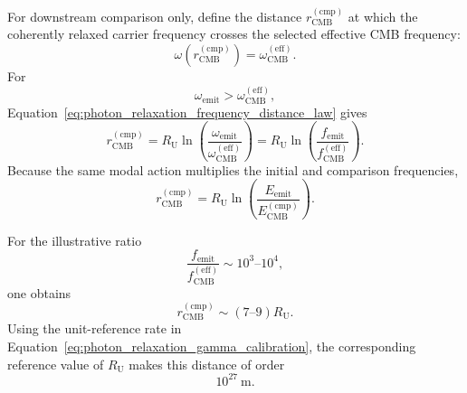 For downstream comparison only, define the distance
\(r_{\mathrm{CMB}}^{(\mathrm{cmp})}\)
at which the coherently relaxed carrier frequency crosses the selected
effective CMB frequency:
\begin{equation}
    \omega
    \left(
        r_{\mathrm{CMB}}^{(\mathrm{cmp})}
    \right)
    =
    \omega_{\mathrm{CMB}}^{(\mathrm{eff})}.
    \label{eq:photon_relaxation_assimilation_condition}
\end{equation}
For
\begin{equation}
    \omega_{\mathrm{emit}}
    >
    \omega_{\mathrm{CMB}}^{(\mathrm{eff})},
    \label{eq:photon_relaxation_assimilation_domain}
\end{equation}
Equation~\eqref{eq:photon_relaxation_frequency_distance_law} gives
\begin{equation}
    r_{\mathrm{CMB}}^{(\mathrm{cmp})}
    =
    R_{\mathrm U}
    \ln
    \left(
        \frac{
            \omega_{\mathrm{emit}}
        }{
            \omega_{\mathrm{CMB}}^{(\mathrm{eff})}
        }
    \right)
    =
    R_{\mathrm U}
    \ln
    \left(
        \frac{
            f_{\mathrm{emit}}
        }{
            f_{\mathrm{CMB}}^{(\mathrm{eff})}
        }
    \right).
    \label{eq:photon_relaxation_assimilation_distance_frequency}
\end{equation}
Because the same modal action multiplies the initial and comparison
frequencies,
\begin{equation}
    r_{\mathrm{CMB}}^{(\mathrm{cmp})}
    =
    R_{\mathrm U}
    \ln
    \left(
        \frac{
            E_{\mathrm{emit}}
        }{
            E_{\mathrm{CMB}}^{(\mathrm{cmp})}
        }
    \right).
    \label{eq:photon_relaxation_assimilation_distance_energy}
\end{equation}

For the illustrative ratio
\begin{equation}
    \frac{
        f_{\mathrm{emit}}
    }{
        f_{\mathrm{CMB}}^{(\mathrm{eff})}
    }
    \sim
    10^3
    \text{--}
    10^4,
    \label{eq:photon_relaxation_optical_cmb_ratio}
\end{equation}
one obtains
\begin{equation}
    r_{\mathrm{CMB}}^{(\mathrm{cmp})}
    \sim
    \left(
        7
        \text{--}
        9
    \right)
    R_{\mathrm U}.
    \label{eq:photon_relaxation_optical_assimilation_scale}
\end{equation}
Using the unit-reference rate in
Equation~\eqref{eq:photon_relaxation_gamma_calibration}, the corresponding
reference value of \(R_{\mathrm U}\) makes this distance of order
\begin{equation}
    10^{27}
    \ \mathrm{m}.
    \label{eq:photon_relaxation_assimilation_order}
\end{equation}

